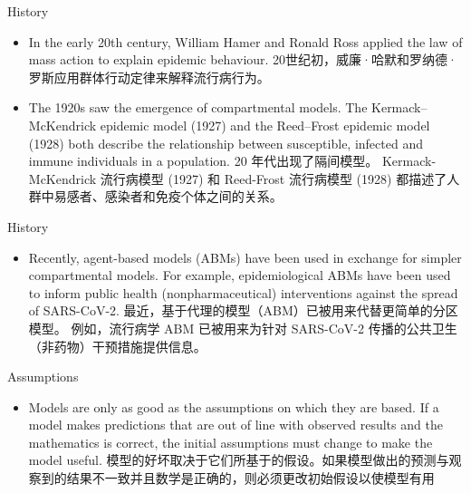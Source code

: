 \documentclass[
  notheorems,
  aspectratio=54,
]{beamer}
\begin{document}
\begin{frame}{History}
  \begin{figure}
    \centering
  \end{figure}
  \begin{itemize}
    \item In the early 20th century, William Hamer and Ronald Ross applied the law of mass action to explain epidemic behaviour. 20世纪初，威廉·哈默和罗纳德·罗斯应用群体行动定律来解释流行病行为。
    \item The 1920s saw the emergence of compartmental models. The Kermack–McKendrick epidemic model (1927) and the Reed–Frost epidemic model (1928) both describe the relationship between susceptible, infected and immune individuals in a population. 20 年代出现了隔间模型。 Kermack-McKendrick 流行病模型 (1927) 和 Reed-Frost 流行病模型 (1928) 都描述了人群中易感者、感染者和免疫个体之间的关系。
  \end{itemize}
\end{frame}

\begin{frame}{History}
  \begin{figure}
    \centering
  \end{figure}
  \begin{itemize}
    \item Recently, agent-based models (ABMs) have been used in exchange for simpler compartmental models. For example, epidemiological ABMs have been used to inform public health (nonpharmaceutical) interventions against the spread of SARS-CoV-2. 最近，基于代理的模型（ABM）已被用来代替更简单的分区模型。 例如，流行病学 ABM 已被用来为针对 SARS-CoV-2 传播的公共卫生（非药物）干预措施提供信息。
  \end{itemize}
\end{frame}

\begin{frame}{Assumptions}
  \begin{itemize}
    \item Models are only as good as the assumptions on which they are based. If a model makes predictions that are out of line with observed results and the mathematics is correct, the initial assumptions must change to make the model useful. 模型的好坏取决于它们所基于的假设。如果模型做出的预测与观察到的结果不一致并且数学是正确的，则必须更改初始假设以使模型有用
  \end{itemize}
\end{frame}
\end{document}
